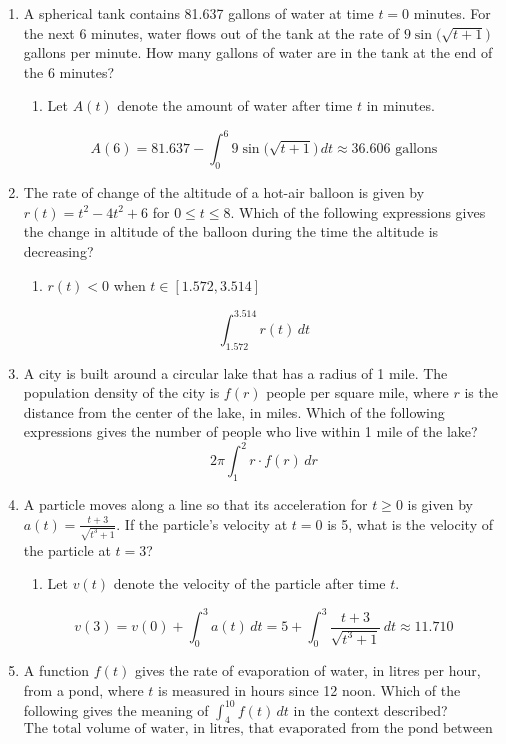 \documentclass[12pt]{article}
\begin{document}
\begin{enumerate}
\begin{enumerate}
    \item A spherical tank contains 81.637 gallons of water at time $t = 0$ minutes. For the next 6 minutes, water flows out of the tank at the rate of $9\sin\big(\sqrt{t+1} \big)$ gallons per minute. How many gallons of water are in the tank at the end of the 6 minutes?
    \begin{enumerate}
        \item Let $A(t)$ denote the amount of water after time $t$ in minutes.
    \end{enumerate}
    $$A(6)=81.637-\int_{0}^{6} 9\sin\big(\sqrt{t+1} \big) \, dt \approx \boxed{36.606 \text{ gallons}}$$

    \item The rate of change of the altitude of a hot-air balloon is given by $r(t) = t^2-4t^2+6$ for $0 \leq t \leq 8.$ Which of the following expressions gives the change in altitude of the balloon during the time the altitude is decreasing?
    \begin{enumerate}
        \item $r(t)<0$ when $t\in[1.572,3.514]$ 
    \end{enumerate}
    $$\boxed{\int_{1.572}^{3.514} r(t)\,dt}$$

    \item A city is built around a circular lake that has a radius of 1 mile. The population density of the city is $f(r)$ people per square mile, where $r$ is the distance from the center of the lake, in miles. Which of the following expressions gives the number of people who live within 1 mile of the lake?
    $$\boxed{2\pi\int_{1}^{2}r \cdot f(r) \, dr}$$

    \item A particle moves along a line so that its acceleration for $t \geq 0$ is given by $a(t)=\frac{t+3}{\sqrt{t^3+1}}$. If the particle’s velocity at $t=0$ is 5, what is the velocity of the particle at $t=3$?
    \begin{enumerate}
        \item Let $v(t)$ denote the velocity of the particle after time $t$.
    \end{enumerate}
    $$v(3)=v(0)+\int_{0}^{3} a(t) \, dt = 5 +\int_{0}^{3} \frac{t+3}{\sqrt{t^3+1}} \, dt \approx \boxed{11.710}$$

    \item A function $f(t)$ gives the rate of evaporation of water, in litres per hour, from a pond, where $t$ is measured in hours since 12 noon. Which of the following gives the meaning of $\int_{4}^{10} f(t) \, dt$ in the context described?
    $$\boxed{\text{The total volume of water, in litres, that evaporated from the pond between 16:00 and 22:00}}$$


\end{enumerate}
\end{enumerate}
\end{document}
